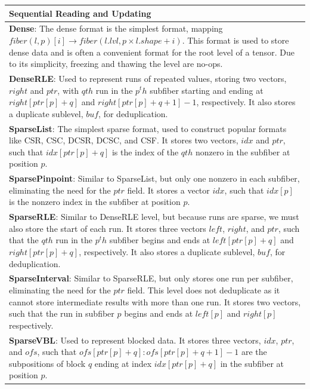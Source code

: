 \begin{table}[ht]
    \centering
    \begin{tabular}{p{14cm}}
    \hline
    \textbf{Sequential Reading and Updating} \\
    \hline
    \textbf{Dense}:
    The dense format is the simplest format, mapping $fiber(l, p)[i] \rightarrow fiber(l.lvl, p \times l.shape + i)$.
    This format is used to store dense data and is often a convenient format for the root level of a tensor.
    Due to its simplicity, freezing and thawing the level are no-ops. \\
    \textbf{DenseRLE}:
    Used to represent runs of repeated values, storing two vectors, $right$ and $ptr$, with $qth$ run in the $p^th$ subfiber starting and ending at $right[ptr[p] + q]$ and $right[ptr[p] + q + 1] - 1$, respectively.
    It also stores a duplicate sublevel, $buf$, for deduplication. \\
    \textbf{SparseList}:
    The simplest sparse format, used to construct popular formats like CSR, CSC, DCSR, DCSC, and CSF.
    It stores two vectors, $idx$ and $ptr$, such that $idx[ptr[p] + q]$ is the index of the $qth$ nonzero in the subfiber at position $p$. \\
    \textbf{SparsePinpoint}:
    Similar to SparseList, but only one nonzero in each subfiber, eliminating the need for the $ptr$ field.
    It stores a vector $idx$, such that $idx[p]$ is the nonzero index in the subfiber at position $p$. \\
    \textbf{SparseRLE}:
    Similar to DenseRLE level, but because runs are sparse, we must also store the start of each run.
    It stores three vectors $left$, $right$, and $ptr$, such that the $qth$ run in the $p^th$ subfiber begins and ends at $left[ptr[p] + q]$ and $right[ptr[p] + q]$, respectively.
    It also stores a duplicate sublevel, $buf$, for deduplication. \\
    \textbf{SparseInterval}:
    Similar to SparseRLE, but only stores one run per subfiber, eliminating the need for the $ptr$ field.
    This level does not deduplicate as it cannot store intermediate results with more than one run.
    It stores two vectors, such that the run in subfiber $p$ begins and ends at $left[p]$ and $right[p]$ respectively. \\
    \textbf{SparseVBL}: Used to represent blocked data. It stores three vectors, $idx$, $ptr$, and $ofs$, such that $ofs[ptr[p] + q]:ofs[ptr[p] + q + 1] - 1$ are the subpositions of block $q$ ending at index $idx[ptr[p] + q]$ in the subfiber at position $p$. \\

\end{tabular}
\end{table}
